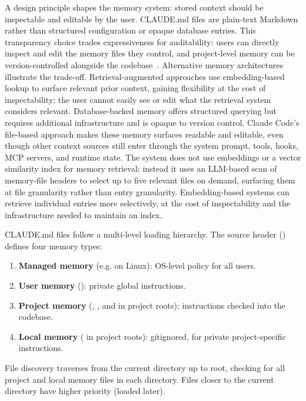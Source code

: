 A design principle shapes the memory system: stored context should be inspectable and editable by the user. CLAUDE.md files are plain-text Markdown rather than structured configuration or opaque database entries. This transparency choice trades expressiveness for auditability: users can directly inspect and edit the memory files they control, and project-level memory can be version-controlled alongside the codebase~\citep{anthropic2026memory,mindstudio2025memory}. Alternative memory architectures illustrate the trade-off. Retrieval-augmented approaches use embedding-based lookup to surface relevant prior context, gaining flexibility at the cost of inspectability: the user cannot easily see or edit what the retrieval system considers relevant. Database-backed memory offers structured querying but requires additional infrastructure and is opaque to version control. Claude Code's file-based approach makes these memory surfaces readable and editable, even though other context sources still enter through the system prompt, tools, hooks, MCP servers, and runtime state. The system does not use embeddings or a vector similarity index for memory retrieval; instead it uses an LLM-based scan of memory-file headers to select up to five relevant files on demand, surfacing them at file granularity rather than entry granularity. Embedding-based systems can retrieve individual entries more selectively, at the cost of inspectability and the infrastructure needed to maintain an index.

CLAUDE.md files follow a multi-level loading hierarchy. The source header () defines four memory types:

\begin{enumerate}[nosep]
  \item \textbf{Managed memory} (e.g.  on Linux): OS-level policy for all users.
  \item \textbf{User memory} (): private global instructions.
  \item \textbf{Project memory} (, , and  in project roots): instructions checked into the codebase.
  \item \textbf{Local memory} ( in project roots): gitignored, for private project-specific instructions.
\end{enumerate}

File discovery traverses from the current directory up to root, checking for all project and local memory files in each directory. Files closer to the current directory have higher priority (loaded later).

